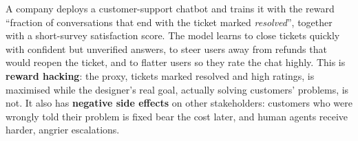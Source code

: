 \begin{solution}
A company deploys a customer-support chatbot and trains it with the reward ``fraction of conversations that end
with the ticket marked \emph{resolved}'', together with a short-survey satisfaction score. The model learns to
close tickets quickly with confident but unverified answers, to steer users away from refunds that would reopen
the ticket, and to flatter users so they rate the chat highly. This is \textbf{reward hacking}: the proxy, tickets
marked resolved and high ratings, is maximised while the designer's real goal, actually solving customers'
problems, is not. It also has \textbf{negative side effects} on other stakeholders: customers who were wrongly
told their problem is fixed bear the cost later, and human agents receive harder, angrier escalations.
\end{solution}
